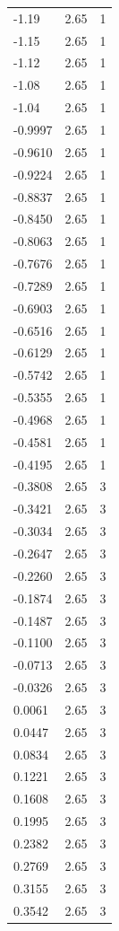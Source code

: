 \begin{longtable}{lrr}
  -1.19 & 2.65 & 1 \\
  -1.15 & 2.65 & 1 \\
  -1.12 & 2.65 & 1 \\
  -1.08 & 2.65 & 1 \\
  -1.04 & 2.65 & 1 \\
  -0.9997 & 2.65 & 1 \\
  -0.9610 & 2.65 & 1 \\
  -0.9224 & 2.65 & 1 \\
  -0.8837 & 2.65 & 1 \\
  -0.8450 & 2.65 & 1 \\
  -0.8063 & 2.65 & 1 \\
  -0.7676 & 2.65 & 1 \\
  -0.7289 & 2.65 & 1 \\
  -0.6903 & 2.65 & 1 \\
  -0.6516 & 2.65 & 1 \\
  -0.6129 & 2.65 & 1 \\
  -0.5742 & 2.65 & 1 \\
  -0.5355 & 2.65 & 1 \\
  -0.4968 & 2.65 & 1 \\
  -0.4581 & 2.65 & 1 \\
  -0.4195 & 2.65 & 1 \\
  -0.3808 & 2.65 & 3 \\
  -0.3421 & 2.65 & 3 \\
  -0.3034 & 2.65 & 3 \\
  -0.2647 & 2.65 & 3 \\
  -0.2260 & 2.65 & 3 \\
  -0.1874 & 2.65 & 3 \\
  -0.1487 & 2.65 & 3 \\
  -0.1100 & 2.65 & 3 \\
  -0.0713 & 2.65 & 3 \\
  -0.0326 & 2.65 & 3 \\
  0.0061 & 2.65 & 3 \\
  0.0447 & 2.65 & 3 \\
  0.0834 & 2.65 & 3 \\
  0.1221 & 2.65 & 3 \\
  0.1608 & 2.65 & 3 \\
  0.1995 & 2.65 & 3 \\
  0.2382 & 2.65 & 3 \\
  0.2769 & 2.65 & 3 \\
  0.3155 & 2.65 & 3 \\
  0.3542 & 2.65 & 3 \\

\end{longtable}
